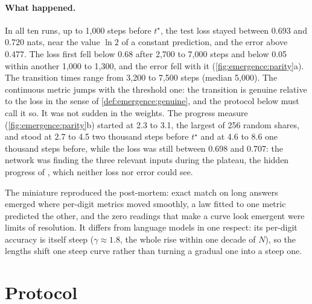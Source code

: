 \begin{refsection}
\paragraph{What happened.} In all ten runs, up to 1,000 steps before $t^\star$, the test loss stayed between 0.693 and 0.720 nats, near the value $\ln2$ of a constant prediction, and the error above 0.477. The loss first fell below 0.68 after 2,700 to 7,000 steps and below 0.05 within another 1,000 to 1,300, and the error fell with it (\cref{fig:emergence:parity}a). The transition times range from 3,200 to 7,500 steps (median 5,000). The continuous metric jumps with the threshold one: the transition is genuine relative to the loss in the sense of \cref{def:emergence:genuine}, and the protocol below must call it so. It was not sudden in the weights. The progress measure (\cref{fig:emergence:parity}b) started at 2.3 to 3.1, the largest of 256 random shares, and stood at 2.7 to 4.5 two thousand steps before $t^\star$ and at 4.6 to 8.6 one thousand steps before, while the loss was still between 0.698 and 0.707: the network was finding the three relevant inputs during the plateau, the hidden progress of \textcite{BarakEtAl2022}, which neither loss nor error could see.

The miniature reproduced the post-mortem: exact match on long answers emerged where per-digit metrics moved smoothly, a law fitted to one metric predicted the other, and the zero readings that make a curve look emergent were limits of resolution. It differs from language models in one respect: its per-digit accuracy is itself steep ($\gamma\approx1.8$, the whole rise within one decade of $N$), so the lengths shift one steep curve rather than turning a gradual one into a steep one.

\section{Protocol}\label{sec:emergence:protocol}


\end{refsection}
